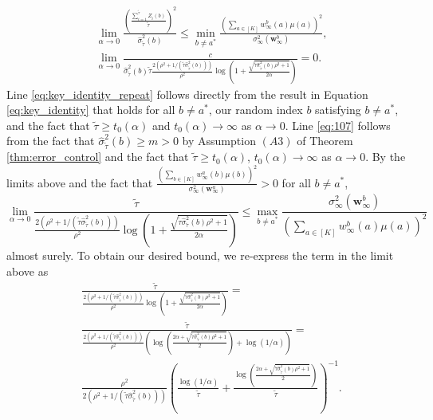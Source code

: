 \documentclass{article}
\begin{document}
\begin{appendices}
\begin{align}
    &\lim_{\alpha \rightarrow 0}\frac{\left(\frac{\sum_{i=1}^{\tilde{\tau}}{Z}_i(b)}{\tilde\tau}\right)^2}{\hat\sigma^2_{\tilde{\tau}}(b)} \leq \min_{b \neq a^*}   \frac{\left(\sum_{a \in [K]}w_\infty^b(a)\mu(a)\right)^2}{\sigma_\infty^2(\bm{w}_\infty^b)},\label{eq:key_identity_repeat} \\
    &\lim_{\alpha\rightarrow 0}\frac{c}{\hat\sigma^2_{\tilde{\tau}}(b)\tilde\tau\frac{2(\rho^2 + 1/(\tilde\tau\hat\sigma^2_{\tilde{\tau}}(b )))}{\rho^2} \log\left( 1+ \frac{\sqrt{\tilde\tau \hat\sigma^2_{\tilde{\tau}}( b )\rho^2 + 1 }}{2\alpha}\right)} = 0. \label{eq:107}
\end{align}
Line \eqref{eq:key_identity_repeat} follows directly from the result in Equation \eqref{eq:key_identity} that holds for all $b \neq a^*$, our random index $b$ satisfying $b \neq a^*$, and the fact that $\tilde\tau \geq t_0(\alpha)$ and $t_0(\alpha) \rightarrow \infty$ as $\alpha \rightarrow 0$. Line \eqref{eq:107} follows from the fact that $\hat\sigma^2_{\tilde{\tau}}(b) \geq m > 0$ by Assumption $(A3)$ of Theorem \ref{thm:error_control} and the fact that $\tilde\tau \geq t_0(\alpha)$, $t_0(\alpha) \rightarrow \infty$ as $\alpha \rightarrow 0$. By the limits above and the fact that $\frac{\left(\sum_{b \in [K]}w_\infty^a(b)\mu(b)\right)^2}{\sigma_\infty^2(\bm{w}_\infty^a)} > 0$ for all $b \neq a^*$, 
\begin{equation}
    \lim_{\alpha \rightarrow 0}  \frac{\tilde\tau}{{ \frac{2(\rho^2 + 1/(\tilde{\tau}\hat\sigma^2_{\tilde{\tau}}( b ) ))}{\rho^2} \log\left( 1+ \frac{\sqrt{\tilde\tau \hat\sigma^2_{\tilde{\tau}}( b )\rho^2 + 1 }}{2\alpha}\right)}} \leq \max_{b \neq a^*} \frac{\sigma_\infty^2(\bm{w}_\infty^b)}{\left(\sum_{a \in [K]}w_\infty^b(a)\mu(a)\right)^2}
\end{equation}
almost surely. To obtain our desired bound, we re-express the term in the limit above as
\begin{align}
    &\frac{\tilde\tau}{{ \frac{2(\rho^2 + 1/(\tilde{\tau}\hat\sigma^2_{\tilde{\tau}}(b ) ))}{\rho^2} \log\left( 1+ \frac{\sqrt{\tilde\tau \hat\sigma^2_{\tilde{\tau}}(b )\rho^2 + 1 }}{2\alpha}\right)}}=\\ & \frac{\tilde\tau}{{ \frac{2(\rho^2 + 1/(\tilde\tau\hat\sigma^2_{\tilde{\tau}}(b ) ))}{\rho^2} \left(\log\left( \frac{2\alpha + \sqrt{\tilde\tau \hat\sigma^2_{\tilde{\tau}}(b )\rho^2 + 1 }}{2}  \right) + \log(1/\alpha)  \right)}}=\\
    & \frac{\rho^2}{2(\rho^2 + 1/(\tilde\tau \hat\sigma^2_{\tilde{\tau}}(b )))}\left(\frac{\log(1/\alpha)}{\tilde\tau} + \frac{\log\left( \frac{2\alpha + \sqrt{\tilde{\tau} \hat\sigma^2_{\tilde{\tau}}(b )\rho^2 + 1 }}{2}  \right)}{\tilde\tau}\right)^{-1}.

\end{align}
\end{appendices}
\end{document}
